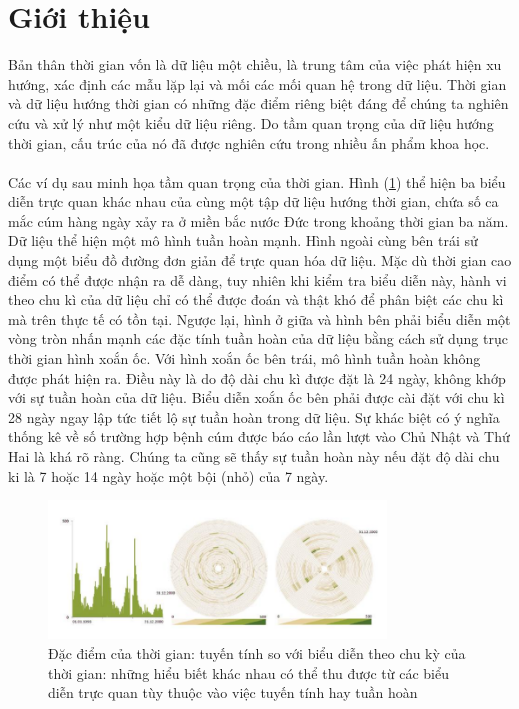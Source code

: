 \section{Giới thiệu}
Bản thân thời gian vốn là dữ liệu một chiều, là trung tâm của việc phát hiện xu hướng, xác định các mẫu lặp lại và mối các mối quan hệ trong dữ liệu. Thời gian và dữ liệu hướng thời gian có những đặc điểm riêng biệt đáng để chúng ta nghiên cứu và xử lý như một kiểu dữ liệu riêng. Do tầm quan trọng của dữ liệu hướng thời gian, cấu trúc của nó đã được nghiên cứu trong nhiều ấn phẩm khoa học. 
\\ \\
Các ví dụ sau minh họa tầm quan trọng của thời gian. Hình (\ref{fig:f7.1}) thể hiện ba biểu diễn trực quan khác nhau của cùng một tập dữ liệu hướng thời gian, chứa số ca mắc cúm hàng ngày xảy ra ở miền bắc nước Đức trong khoảng thời gian ba năm. Dữ liệu thể hiện một mô hình tuần hoàn mạnh. Hình ngoài cùng bên trái sử dụng một biểu đồ đường đơn giản để trực quan hóa dữ liệu. Mặc dù thời gian cao điểm có thể được nhận ra dễ dàng, tuy nhiên khi kiểm tra biểu diễn này, hành vi theo chu kì của dữ liệu chỉ có thể được đoán và thật khó để phân biệt các chu kì mà trên thực tế có tồn tại. Ngược lại, hình ở giữa và hình bên phải biểu diễn một vòng tròn nhấn mạnh các đặc tính tuần hoàn của dữ liệu bằng cách sử dụng trục thời gian hình xoắn ốc. Với hình xoắn ốc bên trái, mô hình tuần hoàn không được phát hiện ra. Điều này là do độ dài chu kì được đặt là 24 ngày, không khớp với sự tuần hoàn của dữ liệu. Biểu diễn xoắn ốc bên phải được cài đặt với chu kì 28 ngày ngay lập tức tiết lộ sự tuần hoàn trong dữ liệu. Sự khác biệt có ý nghĩa thống kê về số trường hợp bệnh cúm được báo cáo lần lượt vào Chủ Nhật và Thứ Hai là khá rõ ràng. Chúng ta cũng sẽ thấy sự tuần hoàn này nếu đặt độ dài chu ki là 7 hoặc 14 ngày hoặc một bội (nhỏ) của 7 ngày.
\begin{figure}[H] %
    \centering %
    \includegraphics[width=0.8\textwidth]{assets/fg-1.png} 
    \caption{Đặc điểm của thời gian: tuyến tính so với biểu diễn theo chu kỳ của thời gian: những hiểu biết khác nhau
    có thể thu được từ các biểu diễn trực quan tùy thuộc vào việc tuyến tính hay tuần hoàn} %
    \label{fig:f7.1}
\end{figure}
